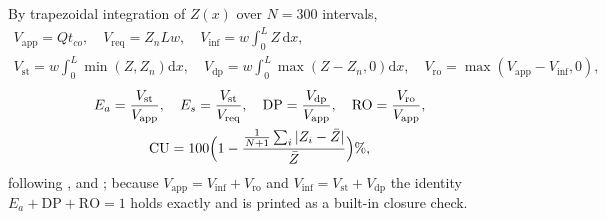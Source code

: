 \documentclass[preprint,12pt]{elsarticle}
\begin{document}
By trapezoidal integration of $Z(x)$ over $N=300$ intervals,
\begin{equation}
\begin{gathered}V_{\mathrm{app}}=Qt_{co},\quad V_{\mathrm{req}}=Z_nLw,\quad V_{\mathrm{inf}}=w\!\!\int_0^L\!\!Z\,\mathrm dx,\\ V_{\mathrm{st}}=w\!\!\int_0^L\!\!\min(Z,Z_n)\mathrm dx,\quad V_{\mathrm{dp}}=w\!\!\int_0^L\!\!\max(Z-Z_n,0)\mathrm dx,\quad V_{\mathrm{ro}}=\max(V_{\mathrm{app}}-V_{\mathrm{inf}},0),\end{gathered}
\label{eq:vols}
\end{equation}
\begin{equation}
\begin{gathered}E_a=\frac{V_{\mathrm{st}}}{V_{\mathrm{app}}},\quad E_s=\frac{V_{\mathrm{st}}}{V_{\mathrm{req}}},\quad \mathrm{DP}=\frac{V_{\mathrm{dp}}}{V_{\mathrm{app}}},\quad \mathrm{RO}=\frac{V_{\mathrm{ro}}}{V_{\mathrm{app}}},\\ \mathrm{CU}=100\Bigl(1-\frac{\frac1{N+1}\sum_i|Z_i-\bar Z|}{\bar Z}\Bigr)\%,\end{gathered}
\label{eq:eff}
\end{equation}
following \cite{Walker1987}, \cite{Burt1997} and \cite{Christiansen1942}; because $V_{\mathrm{app}}=V_{\mathrm{inf}}+V_{\mathrm{ro}}$ and $V_{\mathrm{inf}}=V_{\mathrm{st}}+V_{\mathrm{dp}}$ the identity $E_a+\mathrm{DP}+\mathrm{RO}=1$ holds exactly and is printed as a built-in closure check.
\end{document}
